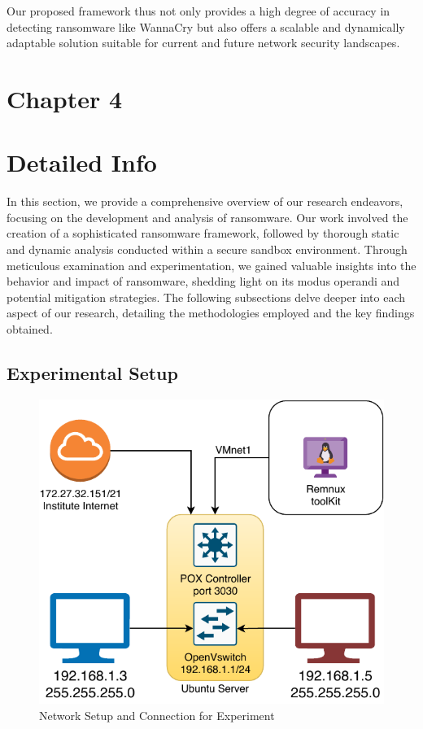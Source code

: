 \documentclass[12pt,letterpaper]{article}
\begin{document}
    Our proposed framework thus not only provides a high degree of accuracy in detecting ransomware like WannaCry but also offers a scalable and dynamically adaptable solution suitable for current and future network security landscapes.
            
\clearpage    
    \newpage
    \section*{Chapter 4}
        \section{Detailed Info}

            In this section, we provide a comprehensive overview of our research endeavors, focusing on the development and analysis of ransomware. Our work involved the creation of a sophisticated ransomware framework, followed by thorough static and dynamic analysis conducted within a secure sandbox environment. Through meticulous examination and experimentation, we gained valuable insights into the behavior and impact of ransomware, shedding light on its modus operandi and potential mitigation strategies. The following subsections delve deeper into each aspect of our research, detailing the methodologies employed and the key findings obtained.
            
            
        \subsection{Experimental Setup}

        \begin{figure}[htt]
            \centering
            \includegraphics{images/NetworkSetip.drawio.pdf}
            \caption{Network Setup and Connection for Experiment}
            \label{fig:Network Setup and Connection for Experiment}
        \end{figure}
\end{document}
